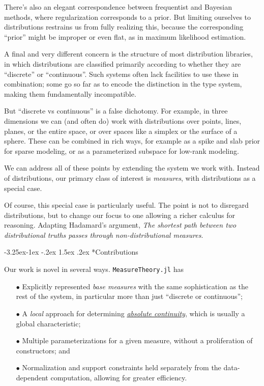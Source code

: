 \documentclass{juliacon}
\makeatletter
\renewcommand\subsection{\@startsection{subsection}{2}{\z@}%
{-3.25ex\@plus -1ex \@minus -.2ex}%
{1.5ex \@plus .2ex}%
{\normalfont\bfseries}}
\makeatother
\begin{document}
There's also an elegant correspondence between frequentist and Bayesian methods, where regularization corresponds to a prior. But limiting ourselves to distributions restrains us from fully realizing this, because the corresponding ``prior'' might be improper or even flat, as in maximum likelihood estimation.

A final and very different concern is the structure of most distribution libraries, in which distributions are classified primarily according to whether they are ``discrete'' or ``continuous''. Such systems often lack facilities to use these in combination; some go so far as to encode the distinction in the type system, making them fundamentally incompatible.

But ``discrete vs continuous'' is a false dichotomy. For example, in three dimensions we can (and often do) work with distributions over points, lines, planes, or the entire space, or over spaces like a simplex or the surface of a  sphere. These can be combined in rich ways, for example as a spike and slab prior for sparse modeling, or as a parameterized subspace for low-rank modeling.

We can address all of these points by extending the system we work with. Instead of distributions, our primary class of interest is \emph{measures}, with distributions as a special case.

Of course, this special case is particularly useful. The point is not to disregard distributions, but to change our focus to one allowing a richer calculus for reasoning. Adapting Hadamard's argument, 
\emph{The shortest path between two distributional truths passes through  non-distributional measures}.    


\subsection*{Contributions}

Our work is novel in several ways. \verb|MeasureTheory.jl| has
\begin{enumerate}
    \item[$\bullet\!$]Explicitly represented \emph{base measures} with the same sophistication as the rest of the system, in particular more than just ``discrete or continuous'';
    \item[$\bullet\!$]A \emph{local} approach for determining \href{https://en.wikipedia.org/wiki/Absolute_continuity}{\emph{absolute continuity}}, which is usually a global characteristic;
    \item[$\bullet\!$]Multiple parameterizations for a given measure, without a proliferation of constructors; and
    \item[$\bullet\!$]Normalization and support constraints held separately from the data-dependent computation, allowing for greater efficiency.
\end{enumerate}
\end{document}
